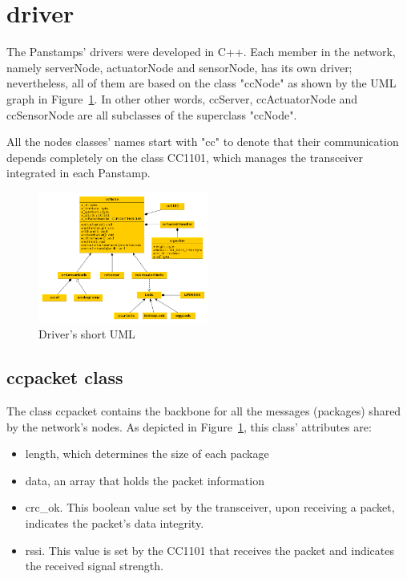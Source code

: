 \section{driver}
The Panstamps' drivers were developed in C++. Each member in the network, namely serverNode, actuatorNode and sensorNode, has its own driver; nevertheless, all of them are based on the class "ccNode" as shown by the UML graph in Figure~\ref{fig:driverUML}. In other other words, ccServer, ccActuatorNode and ccSensorNode are all subclasses of the superclass "ccNode". 

All the nodes classes' names start with "cc" to denote that their communication depends completely on the class CC1101, which manages the transceiver integrated in each Panstamp.

\begin{figure}[h!] 
 \centering
 \includegraphics[width= 0.5\textwidth, clip=true,keepaspectratio=true] {./graph/driver-short.png}
 \caption{Driver's short UML }
 \label{fig:driverUML}
\end{figure}  

\subsection{ccpacket class}
\label{sec:ccpacket class}
The class ccpacket contains the backbone for all the messages (packages) shared by the network's nodes. As depicted in Figure~\ref{fig:driverUML}, this class' attributes are:
\begin{itemize}
\item length, which determines the size of each package
\item data, an array that holds the packet information
\item crc\_ok. This boolean value set by the transceiver, upon receiving a packet, indicates the packet's data integrity. 
\item rssi. This value is set by the CC1101 that receives the packet and indicates the received signal strength.
\end{itemize}

